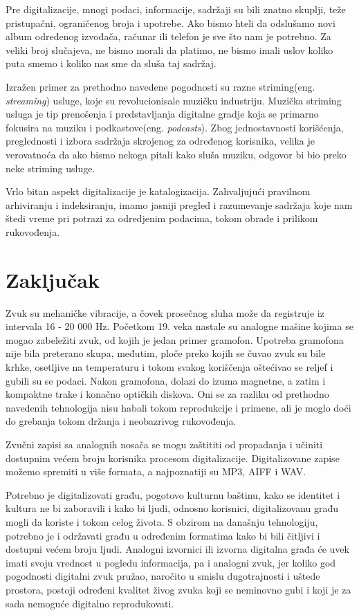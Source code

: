 \documentclass[a4paper]{article}
\begin{document}
Pre digitalizacije, mnogi podaci, informacije, sadržaji su bili znatno skuplji, teže pristupačni, ograničenog broja i upotrebe. Ako bismo hteli da odslušamo novi album određenog izvođača, računar ili telefon je sve što nam je potrebno. Za veliki broj slučajeva, ne bismo morali da platimo, ne bismo imali uslov koliko puta smemo i koliko nas sme da sluša taj sadržaj. 

Izražen primer za prethodno navedene pogodnosti su razne striming(eng. \textit{streaming}) usluge, koje su revolucionisale muzičku industriju. Muzička striming usluga je tip prenošenja i predstavljanja digitalne gradje koja se primarno fokusira na muziku i podkastove(eng. \textit{podcasts}). Zbog jednostavnosti korišćenja, preglednosti i izbora sadržaja skrojenog za određenog korisnika, velika je verovatnoća da ako bismo nekoga pitali kako sluša muziku, odgovor bi bio preko neke striming usluge.
 
Vrlo bitan aspekt digitalizacije je katalogizacija. Zahvaljujući pravilnom arhiviranju i indeksiranju, imamo jasniji pregled i razumevanje sadržaja koje nam štedi vreme pri potrazi za odredjenim podacima, tokom obrade i prilikom rukovođenja\cite{jurkovic2021digitalizacija}.

\section{Zaključak}
\label{sec:zakljucak}

Zvuk su mehaničke vibracije, a čovek prosečnog sluha može da registruje iz intervala 16 - 20 000 Hz. Početkom 19. veka nastale su analogne mašine kojima se mogao zabeležiti zvuk, od kojih je jedan primer gramofon. Upotreba gramofona nije bila preterano skupa, međutim, ploče preko kojih se čuvao zvuk su bile krhke, osetljive na temperaturu i tokom svakog koriščenja oštećivao se reljef i gubili su se podaci. Nakon gramofona, dolazi do izuma magnetne, a zatim i kompaktne trake i konačno optičkih diskova. Oni se za razliku od prethodno navedenih tehnologija nisu habali tokom reprodukcije i primene, ali je moglo doći do grebanja tokom držanja i neobazrivog rukovođenja.

Zvučni zapisi sa analognih nosača se mogu zaštititi od propadanja i učiniti dostupnim većem broju korisnika procesom digitalizacije. Digitalizovane zapise možemo spremiti u više formata, a najpoznatiji su MP3, AIFF i WAV. 

Potrebno je digitalizovati građu, pogotovo kulturnu baštinu, kako se identitet i kultura ne bi zaboravili i kako bi ljudi, odnosno korisnici, digitalizovanu građu mogli da koriste i tokom celog života. S obzirom na današnju tehnologiju, potrebno je i održavati građu u određenim formatima kako bi bili čitljivi i dostupni većem broju ljudi.
Analogni izvornici ili izvorna digitalna građa će uvek imati svoju vrednost u pogledu informacija, pa i analogni zvuk, jer koliko god pogodnosti digitalni zvuk pružao, naročito u smislu dugotrajnosti i uštede prostora, postoji određeni kvalitet živog zvuka koji se neminovno gubi i koji je za sada nemoguće digitalno reprodukovati.
\end{document}
